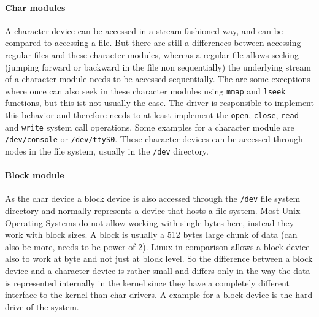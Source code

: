 \documentclass{sig-alternate-05-2015}
\begin{document}
\paragraph{Char modules}
A character device can be accessed in a stream fashioned way, and can be compared to accessing a file. But there are still a differences between accessing regular files and these character modules, whereas a regular file allows seeking (jumping forward or backward in the file non sequentially) the underlying stream of a character module needs to be accessed sequentially. The are some exceptions where once can also seek in these character modules using \texttt{mmap} and \texttt{lseek} functions, but this ist not usually the case. The driver is responsible to implement this behavior and therefore needs to at least implement the \texttt{open}, \texttt{close}, \texttt{read} and \texttt{write} system call operations. Some examples for a character module are \texttt{/dev/console} or \texttt{/dev/ttyS0}. These character devices can be accessed through nodes in the file system, usually in the \texttt{/dev} directory.

\paragraph{Block module}
As the char device a block device is also accessed through the \texttt{/dev} file system directory and normally represents a device that hosts a file system. Most Unix Operating Systems do not allow working with single bytes here, instead they work with block sizes. A block is usually a 512 bytes large chunk of data (can also be more, needs to be power of 2). Linux in comparison allows a block device also to work at byte and not just at block level. So the difference between a block device and a character device is rather small and differs only in the way the data is represented internally in the kernel since they have a completely different interface to the kernel than char drivers. A example for a block device is the hard drive of the system.
\end{document}
